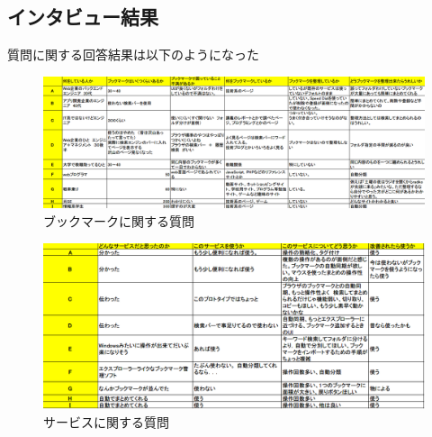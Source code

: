 \documentclass[a4paper,10pt,fleqn]{jsarticle}
\begin{document}
\subsection{インタビュー結果}
質問に関する回答結果は以下のようになった

\begin{figure}[htbp]
  \caption{ブックマークに関する質問}
  \begin{center}
    \includegraphics[width=14cm]{./interview-res-1.png}
  \end{center}
\end{figure}
\begin{figure}[htbp]
  \caption{サービスに関する質問}
  \begin{center}
    \includegraphics[width=14cm]{./interview-res-2.png}
  \end{center}
\end{figure}
\end{document}
